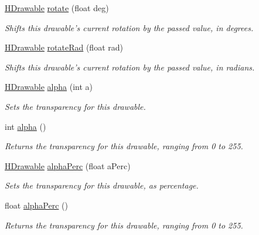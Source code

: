 \begin{DoxyCompactItemize}
\item 
\hyperlink{classhype_1_1drawable_1_1_h_drawable}{H\-Drawable} \hyperlink{classhype_1_1drawable_1_1_h_drawable_a8653551b0b72c984441c981240339933}{rotate} (float deg)
\begin{DoxyCompactList}\small\item\em Shifts this drawable's current rotation by the passed value, in degrees. \end{DoxyCompactList}\item 
\hyperlink{classhype_1_1drawable_1_1_h_drawable}{H\-Drawable} \hyperlink{classhype_1_1drawable_1_1_h_drawable_a6e123a6ba9376fbc08d1b622bfcfeb95}{rotate\-Rad} (float rad)
\begin{DoxyCompactList}\small\item\em Shifts this drawable's current rotation by the passed value, in radians. \end{DoxyCompactList}\item 
\hyperlink{classhype_1_1drawable_1_1_h_drawable}{H\-Drawable} \hyperlink{classhype_1_1drawable_1_1_h_drawable_a03c7275f5caab5cc9034b18d4c2f1305}{alpha} (int a)
\begin{DoxyCompactList}\small\item\em Sets the transparency for this drawable. \end{DoxyCompactList}\item 
int \hyperlink{classhype_1_1drawable_1_1_h_drawable_a3cdefeadb2538268501043a0ca07177e}{alpha} ()
\begin{DoxyCompactList}\small\item\em Returns the transparency for this drawable, ranging from 0 to 255. \end{DoxyCompactList}\item 
\hyperlink{classhype_1_1drawable_1_1_h_drawable}{H\-Drawable} \hyperlink{classhype_1_1drawable_1_1_h_drawable_a0b94a8de9bf539f1d5a16fcdea544fbb}{alpha\-Perc} (float a\-Perc)
\begin{DoxyCompactList}\small\item\em Sets the transparency for this drawable, as percentage. \end{DoxyCompactList}\item 
float \hyperlink{classhype_1_1drawable_1_1_h_drawable_a6c3f8eae8eeaa68ee76003d732b99bac}{alpha\-Perc} ()
\begin{DoxyCompactList}\small\item\em Returns the transparency for this drawable, ranging from 0 to 255. \end{DoxyCompactList}\item 

\end{DoxyCompactItemize}
